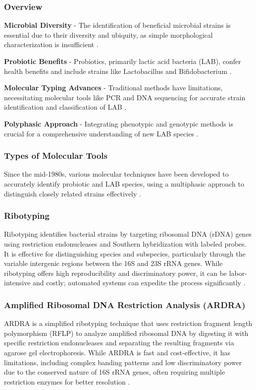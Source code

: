 \subsubsection*{Overview}
\textbf{Microbial Diversity} - The identification of beneficial microbial strains is essential due to their diversity and ubiquity, as simple morphological characterization is insufficient \cite*{L4-MolTyping}.

\textbf{Probiotic Benefits} - Probiotics, primarily lactic acid bacteria (LAB), confer health benefits and include strains like Lactobacillus and Bifidobacterium \cite*{L4-MolTyping}.

\textbf{Molecular Typing Advances} - Traditional methods have limitations, necessitating molecular tools like PCR and DNA sequencing for accurate strain identification and classification of LAB \cite*{L4-MolTyping}.

\textbf{Polyphasic Approach} - Integrating phenotypic and genotypic methods is crucial for a comprehensive understanding of new LAB species \cite*{L4-MolTyping}.

\subsubsection*{Types of Molecular Tools}
Since the mid-1980s, various molecular techniques have been developed to accurately identify probiotic and LAB species, using a multiphasic approach to distinguish closely related strains effectively \cite*{L4-MolTyping}.

\subsubsection{Ribotyping}
Ribotyping identifies bacterial strains by targeting ribosomal DNA (rDNA) genes using restriction endonucleases and Southern hybridization with labeled probes. It is effective for distinguishing species and subspecies, particularly through the variable intergenic regions between the 16S and 23S rRNA genes. While ribotyping offers high reproducibility and discriminatory power, it can be labor-intensive and costly; automated systems can expedite the process significantly \cite*{L4-MolTyping}.

\subsubsection{Amplified Ribosomal DNA Restriction Analysis (ARDRA)}
ARDRA is a simplified ribotyping technique that uses restriction fragment length polymorphism (RFLP) to analyze amplified ribosomal DNA by digesting it with specific restriction endonucleases and separating the resulting fragments via agarose gel electrophoresis. While ARDRA is fast and cost-effective, it has limitations, including complex banding patterns and low discriminatory power due to the conserved nature of 16S rRNA genes, often requiring multiple restriction enzymes for better resolution \cite*{L4-MolTyping}.

